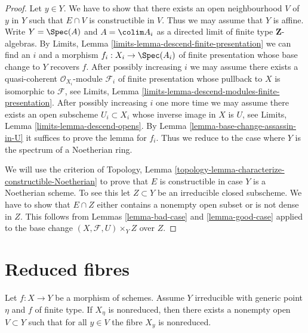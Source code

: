 \begin{proof}
Let $y \in Y$. We have to show that there exists an open neighbourhood
$V$ of $y$ in $Y$ such that $E \cap V$ is constructible in $V$. Thus we may
assume that $Y$ is affine. Write $Y = \Spec(A)$ and
$A = \colim A_i$ as a directed limit of finite type
$\mathbf{Z}$-algebras. By
Limits, Lemma \ref{limits-lemma-descend-finite-presentation}
we can find an $i$ and a morphism $f_i : X_i \to \Spec(A_i)$ of
finite presentation whose base change to $Y$ recovers $f$.
After possibly increasing $i$ we may assume there exists a
quasi-coherent $\mathcal{O}_{X_i}$-module $\mathcal{F}_i$ of finite
presentation whose pullback to $X$ is isomorphic to $\mathcal{F}$, see
Limits, Lemma \ref{limits-lemma-descend-modules-finite-presentation}.
After possibly increasing $i$ one more time we may assume there exists
an open subscheme $U_i \subset X_i$ whose inverse image in $X$
is $U$, see
Limits, Lemma \ref{limits-lemma-descend-opens}.
By
Lemma \ref{lemma-base-change-assassin-in-U}
it suffices to prove the lemma for $f_i$. Thus we reduce to
the case where $Y$ is the spectrum of a Noetherian ring.

\medskip\noindent
We will use the criterion of
Topology, Lemma \ref{topology-lemma-characterize-constructible-Noetherian}
to prove that $E$ is constructible in case $Y$ is a Noetherian scheme.
To see this let $Z \subset Y$ be an irreducible closed subscheme.
We have to show that $E \cap Z$ either contains a nonempty open subset
or is not dense in $Z$. This follows from
Lemmas \ref{lemma-bad-case} and
\ref{lemma-good-case}
applied to the base change $(X, \mathcal{F}, U) \times_Y Z$ over $Z$.
\end{proof}











\section{Reduced fibres}
\label{section-reduced}

\begin{lemma}
\label{lemma-nonreduced-in-neighbourhood}
Let $f : X \to Y$ be a morphism of schemes. Assume $Y$ irreducible with
generic point $\eta$ and $f$ of finite type. If $X_\eta$ is nonreduced,
then there exists a nonempty open $V \subset Y$
such that for all $y \in V$ the fibre $X_y$ is nonreduced.
\end{lemma}


